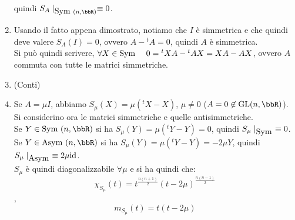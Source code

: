 \documentclass[a4paper,NoNotes,GeneralMath]{stdmdoc}
\begin{document}
\begin{enumerate}
				quindi $S_A\mid_{\Symm(n,\bbR)} \equiv 0$.
		\item Usando il fatto appena dimostrato, notiamo che $I$ è simmetrica e che quindi deve valere $S_A(I) = 0$, ovvero $A - {}^tA = 0$, quindi $A$ è simmetrica. \\
			Si può quindi scrivere, $\forall X \in \mbox{Sym } \quad 0 = {}^tXA - {}^tAX = XA - AX$, ovvero $A$ commuta con tutte le matrici simmetriche.
		\item (Conti)
		\item Se $A = \mu I$, abbiamo $S_\mu (X) = \mu ({}^tX - X)$, $\mu \neq 0$ ($A = 0 \not\in \GL(n, \bbR)$). Si considerino ora le matrici simmetriche e quelle antisimmetriche. \\
			Se $Y \in \Symm(n, \bbR)$ si ha $S_\mu (Y) = \mu ({}^tY - Y) = 0$, quindi $S_\mu\mid_{\mbox{Sym }} \equiv 0$. Se $Y \in \Asymm(n, \bbR)$ si ha $S_\mu(Y) = \mu ({}^tY - Y) = - 2\mu Y$,
			quindi $S_\mu\mid_{\mbox{Asym }} \equiv 2\mu \mbox{id}$. \\
			$S_\mu$ è quindi diagonalizzabile $\forall \mu$ e si ha quindi che: $$\chi_{S_\mu} (t) = t^{\frac{n(n+1)}{2}}(t-2\mu)^{\frac{n(n-1)}{2}}$$, $$m_{S_\mu} (t) = t (t-2\mu)$$
	\end{enumerate}
	
\end{document}
